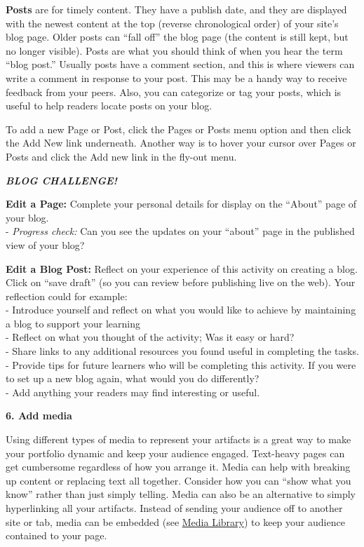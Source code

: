 \documentclass[
]{book}
\theoremstyle{definition}
\theoremstyle{definition}
\theoremstyle{definition}
\theoremstyle{definition}
\theoremstyle{remark}
\begin{document}
\begin{reflect}
\textbf{Posts} are for timely content. They have a publish date, and they are displayed with the newest content at the top (reverse chronological order) of your site's blog page. Older posts can ``fall off'' the blog page (the content is still kept, but no longer visible). Posts are what you should think of when you hear the term ``blog post.'' Usually posts have a comment section, and this is where viewers can write a comment in response to your post. This may be a handy way to receive feedback from your peers. Also, you can categorize or tag your posts, which is useful to help readers locate posts on your blog.

To add a new Page or Post, click the Pages or Posts menu option and then click the Add New link underneath. Another way is to hover your cursor over Pages or Posts and click the Add new link in the fly-out menu.

\textbf{\emph{BLOG CHALLENGE!}}

\textbf{Edit a Page:} Complete your personal details for display on the ``About'' page of your blog.\\
- \emph{Progress check:} Can you see the updates on your ``about'' page in the published view of your blog?

\textbf{Edit a Blog Post:} Reflect on your experience of this activity on creating a blog.
Click on ``save draft'' (so you can review before publishing live on the web). Your reflection could for example:\\
- Introduce yourself and reflect on what you would like to achieve by maintaining a blog to support your learning\\
- Reflect on what you thought of the activity; Was it easy or hard?\\
- Share links to any additional resources you found useful in completing the tasks.\\
- Provide tips for future learners who will be completing this activity. If you were to set up a new blog again, what would you do differently?\\
- Add anything your readers may find interesting or useful.

\textbf{6. Add media}

Using different types of media to represent your artifacts is a great way to make your portfolio dynamic and keep your audience engaged. Text-heavy pages can get cumbersome regardless of how you arrange it. Media can help with breaking up content or replacing text all together. Consider how you can ``show what you know'' rather than just simply telling. Media can also be an alternative to simply hyperlinking all your artifacts. Instead of sending your audience off to another site or tab, media can be embedded (see \href{https://create.twu.ca/eportfolios/wordpress/media-library/}{Media Library}) to keep your audience contained to your page.


\end{reflect}
\end{document}
